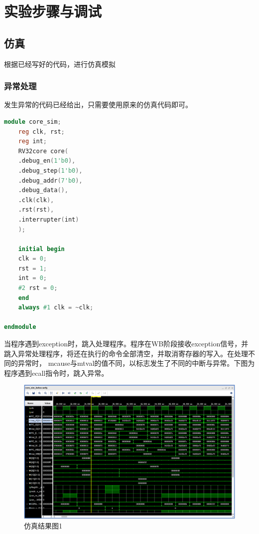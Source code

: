 
\section{实验步骤与调试}
\subsection{仿真} 根据已经写好的代码，进行仿真模拟\\
\subsubsection{异常处理}
发生异常的代码已经给出，只需要使用原来的仿真代码即可。
\begin{lstlisting}[language = {verilog}]
module core_sim;
	reg clk, rst;
	reg int;
	RV32core core(
	.debug_en(1'b0),
	.debug_step(1'b0),
	.debug_addr(7'b0),
	.debug_data(),
	.clk(clk),
	.rst(rst),
	.interrupter(int)
	);
	
	initial begin
	clk = 0;
	rst = 1;
	int = 0;
	#2 rst = 0;
	end
	always #1 clk = ~clk;
	
endmodule
\end{lstlisting}
当程序遇到exception时，跳入处理程序。程序在WB阶段接收exception信号，并跳入异常处理程序，将还在执行的命令全部清空，并取消寄存器的写入。在处理不同的异常时， mcause与mtval的值不同，以标志发生了不同的中断与异常。下图为程序遇到ecall指令时，跳入异常。
\begin{figure}[H] %
	\centering %
	\includegraphics[width=1.0\textwidth]{figs/1.png} %
	\caption{仿真结果图1} %
	\label{Fig.11} %
\end{figure}
